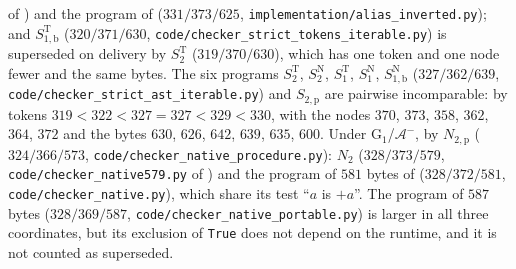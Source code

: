 of ) and the program of 
($331/373/625$, \texttt{implementation/alias\_inverted.py}); and
$S^{\mathrm T}_{1,\mathrm b}$ ($320/371/630$,
\texttt{code/checker\_strict\_tokens\_iterable.py}) is superseded on delivery by
$S^{\mathrm T}_2$ ($319/370/630$), which has one token and one node fewer and the
same bytes. The six programs $S^{\mathrm T}_2$, $S^{\mathrm N}_2$, $S^{\mathrm T}_1$,
$S^{\mathrm N}_1$, $S^{\mathrm N}_{1,\mathrm b}$ ($327/362/639$,
\texttt{code/checker\_strict\_ast\_iterable.py}) and $S_{2,\mathrm p}$ are pairwise
incomparable: by tokens $319<322<327=327<329<330$, with the nodes $370$, $373$,
$358$, $362$, $364$, $372$ and the bytes $630$, $626$, $642$, $639$, $635$, $600$.
Under G$_1$/$\mathcal A^{-}$, by $N_{2,\mathrm p}$ ($324/366/573$,
\texttt{code/checker\_native\_procedure.py}): $N_2$ ($328/373/579$,
\texttt{code/checker\_native579.py} of ) and the program of
$581$ bytes of  ($328/372/581$,
\texttt{code/checker\_native.py}), which share its test ``$a$ is $+a$''. The
program of $587$ bytes ($328/369/587$, \texttt{code/checker\_native\_portable.py})
is larger in all three coordinates, but its exclusion of \texttt{True} does not
depend on the runtime, and it is not counted as superseded.

